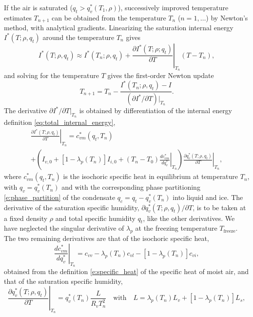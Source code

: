 \documentclass{report}
\begin{document}
If the air is saturated ($q_t > q_v^*(T_1, \rho)$), successively improved temperature estimates $T_{n+1}$ can be obtained from the temperature $T_n$ ($n=1,\dots$) by Newton's method, with analytical gradients. Linearizing the saturation internal energy $I^*(T; \rho, q_t)$ around the temperature $T_n$ gives
\begin{equation}
    I^*(T; \rho, q_t) \approx I^*(T_n; \rho, q_t) + \left.\frac{\partial I^*(T; \rho; q_t)}{\partial T}\right|_{T_n} (T - T_n),
\end{equation}
and solving for the temperature $T$ gives the first-order Newton update
\begin{equation}
    T_{n+1} = T_{n} - \frac{I^*(T_{n}; \rho, q_t) - I}{(\partial I^*/\partial T)|_{T_{n}}}.
\end{equation}
The derivative $\partial I^*/\partial T|_{T_n}$ is obtained by differentiation of the internal energy definition \eqref{eq:total_internal_energy},
\begin{multline}
     \left.\frac{\partial I^*(T; \rho, q_t)}{\partial T}\right|_{T_n} 
     = c_{vm}^*(q_t, T_n) \\
     +  \left( I_{v,0} + [1-\lambda_p(T_n)]I_{i,0} + (T_n - T_0) \left. \frac{dc_{vm}^*}{dq_v^*}\right|_{T_n} \right) \left. \frac{\partial q_v^*(T; \rho, q_t)}{\partial T}\right|_{T_n},
\end{multline}
where $c_{vm}^*(q_t, T_n)$ is the isochoric specific heat in equilibrium at temperature $T_n$, with $q_v = q_v^*(T_n)$ and with the corresponding phase partitioning \eqref{e:phase_partition} of the condensate $q_c = q_t - q_v^*(T_n)$ into liquid and ice. The derivative of the saturation specific humidity, $\partial q_v^*(T;\rho, q_t)/\partial T$, is to be taken at a fixed density $\rho$ and total specific humidity $q_t$, like the other derivatives. We have neglected the singular derivative of $\lambda_p$ at the freezing temperature $T_{\mathrm{freeze}}$. The two remaining derivatives are that of the isochoric specific heat,
\begin{equation}
    \left. \frac{dc_{vm}^*}{dq_v^*}\right|_{T_n} = c_{vv} - \lambda_p(T_n) c_{vl} - [1-\lambda_p(T_n)]c_{vi},
\end{equation}
obtained from the definition \eqref{e:specific_heat} of the specific heat of moist air, and that of the saturation specific humidity,
\begin{equation}
    \left. \frac{\partial q_v^*(T; \rho, q_t)}{\partial T}\right|_{T_n} = q_v^*(T_n) \frac{L}{R_v T_n^2} \quad \text{with} \quad L = \lambda_p(T_n) L_v + [1-\lambda_p(T_n)] L_s,
\end{equation}
\end{document}
